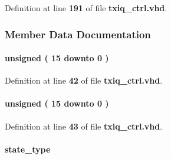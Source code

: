 Definition at line {\bf 191} of file {\bf txiq\+\_\+ctrl.\+vhd}.



\subsubsection{Member Data Documentation}
\paragraph[{cnt}]{ {\bfseries \textcolor{comment}{unsigned}\textcolor{vhdlchar}{ }\textcolor{vhdlchar}{(}\textcolor{vhdlchar}{ }\textcolor{vhdlchar}{ } \textcolor{vhdldigit}{15} \textcolor{vhdlchar}{ }\textcolor{keywordflow}{downto}\textcolor{vhdlchar}{ }\textcolor{vhdlchar}{ } \textcolor{vhdldigit}{0} \textcolor{vhdlchar}{ }\textcolor{vhdlchar}{)}\textcolor{vhdlchar}{ }} \hspace{0.3cm}{\ttfamily [Signal]}}\label{classtxiq__ctrl_1_1arch_ab542534ef27a544efb82f82536b78dd3}


Definition at line {\bf 42} of file {\bf txiq\+\_\+ctrl.\+vhd}.

\paragraph[{cnt\+\_\+max}]{ {\bfseries \textcolor{comment}{unsigned}\textcolor{vhdlchar}{ }\textcolor{vhdlchar}{(}\textcolor{vhdlchar}{ }\textcolor{vhdlchar}{ } \textcolor{vhdldigit}{15} \textcolor{vhdlchar}{ }\textcolor{keywordflow}{downto}\textcolor{vhdlchar}{ }\textcolor{vhdlchar}{ } \textcolor{vhdldigit}{0} \textcolor{vhdlchar}{ }\textcolor{vhdlchar}{)}\textcolor{vhdlchar}{ }} \hspace{0.3cm}{\ttfamily [Signal]}}\label{classtxiq__ctrl_1_1arch_a53f00cb27741d24ec5f9e97036a02a0a}


Definition at line {\bf 43} of file {\bf txiq\+\_\+ctrl.\+vhd}.

\paragraph[{current\+\_\+state}]{ {\bfseries {\bfseries {\bf state\+\_\+type}} \textcolor{vhdlchar}{ }} \hspace{0.3cm}{\ttfamily [Signal]}}\label{classtxiq__ctrl_1_1arch_a7ede5b91aac1f3d1b2a884a5e191d554}


